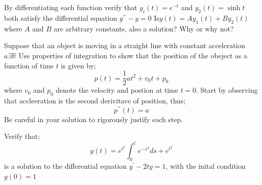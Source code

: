 \documentclass[12pt,letterpaper]{hmcpset}
\begin{document}
\section*{}






\begin{problem}[Problem 1]
By differentiating each function verify that $y_i(t)= e^{-t}$ and $y_2(t) = \sinh t$ both satisfy the differential equation $y^{\prime\prime}-y= 0$ Is$ y(t) = Ay_1(t) +By_2(t)$ where $A$ and $B$ are arbitrary constants, also a solution? Why or why not?
\end{problem}
\newpage


\begin{problem}[2. ]
   Suppose that an object is moving in a straight line with constant acceleration $a \exists \mathbb{R}$ Use properties of integration to show that the position of the obeject as a function of time $t$ is given by; 
   $$ p(t) = \frac{1}{2}at^2+v_0t+p_0$$
   where $v_0$ and $p_0$ denote the velocity and postion at time $t=0$. Start by observing that accleeration is the second derivitave of position, thus; 
   $$ p^{\prime \prime} (t) = a$$
   Be careful in your solution to rigorously justify each step. 
\end{problem}

\begin{solution}
    \vfill
\end{solution}

\newpage


\begin{problem}[3]
   Verify that; 
   $$ y(t) = e^{t^2} \int_{0}^{t} e^{-s^2}ds+e^{t^2}$$
   is a solution to the differential equation $y^{\prime} -2ty = 1$, with the inital condition $y(0) = 1$
\end{problem}

\begin{solution}
    \vfill
\end{solution}

\newpage

\end{document}
